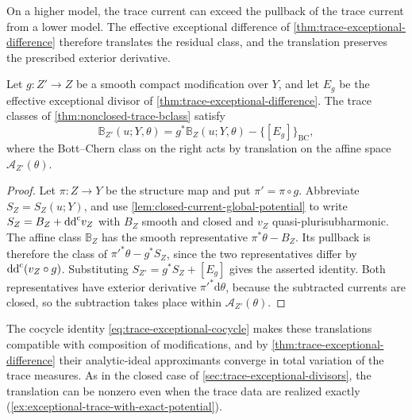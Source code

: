 On a higher model, the trace current can exceed the pullback of the trace current from a lower model. The effective exceptional difference of \cref{thm:trace-exceptional-difference} therefore translates the residual class, and the translation preserves the prescribed exterior derivative.

\begin{corollary}\label{cor:affine-trace-exceptional-difference}
Let $g\colon Z'\to Z$ be a smooth compact modification over $Y$, and let $E_g$ be the effective exceptional divisor of \cref{thm:trace-exceptional-difference}. The trace classes of \cref{thm:nonclosed-trace-bclass} satisfy
\[
 \mathbb B_{Z'}(u;Y,\theta)
       =g^*\mathbb B_Z(u;Y,\theta)-\{[E_g]\}_{\mathrm{BC}},
\]
where the Bott--Chern class on the right acts by translation on the affine space $\mathscr A_{Z'}(\theta)$.
\end{corollary}
\begin{proof}
Let $\pi\colon Z\to Y$ be the structure map and put $\pi'=\pi\circ g$. Abbreviate $S_Z=S_Z(u;Y)$, and use \cref{lem:closed-current-global-potential} to write $S_Z=B_Z+\mathrm{dd}^{\mathrm{c}} v_Z$ with $B_Z$ smooth and closed and $v_Z$ quasi-plurisubharmonic. The affine class $\mathbb B_Z$ has the smooth representative $\pi^*\theta-B_Z$. Its pullback is therefore the class of $\pi'^*\theta-g^*S_Z$, since the two representatives differ by $\mathrm{dd}^{\mathrm{c}}(v_Z\circ g)$. Substituting $S_{Z'}=g^*S_Z+[E_g]$ gives the asserted identity. Both representatives have exterior derivative $\pi'^*\mathrm{d}\theta$, because the subtracted currents are closed, so the subtraction takes place within $\mathscr A_{Z'}(\theta)$.
\end{proof}

The cocycle identity \eqref{eq:trace-exceptional-cocycle} makes these translations compatible with composition of modifications, and by \cref{thm:trace-exceptional-difference} their analytic-ideal approximants converge in total variation of the trace measures. As in the closed case of \cref{sec:trace-exceptional-divisors}, the translation can be nonzero even when the trace data are realized exactly (\cref{ex:exceptional-trace-with-exact-potential}).

